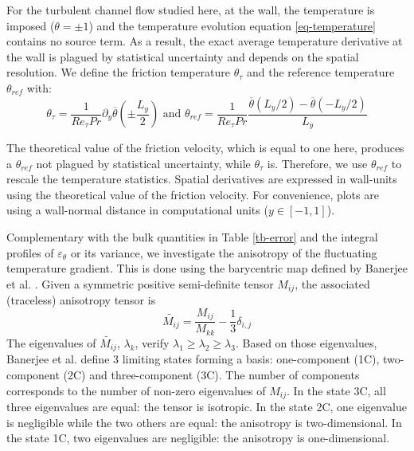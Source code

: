 \documentclass[review]{elsarticle}
\newcommand{\epst}{\varepsilon_\theta}
\begin{document}
For the turbulent channel flow studied here, at the wall, the temperature is imposed ($\theta = \pm 1$) and the temperature evolution equation \ref{eq-temperature} contains no source term. As a result, the exact average temperature derivative at the wall is plagued by statistical uncertainty and depends on the spatial resolution. We define the friction temperature $\theta_\tau$ and the reference temperature $\theta_{ref}$ with:
\begin{equation}
\theta_\tau = \frac{1}{Re_\tau Pr} \partial_y \overline{\theta} \left(\pm \frac{L_y}{2} \right)
\mbox{ and }
\theta_{ref} = \frac{1}{Re_\tau Pr} \frac{\overline{\theta}\left(L_y/2\right)-\overline{\theta}\left(-L_y/2\right)}{L_y}
\end{equation}

The theoretical value of the friction velocity, which is equal to one here, produces a $\theta_{ref}$ not plagued by statistical uncertainty, while $\theta_\tau$ is. Therefore, we use $\theta_{ref}$ to rescale the temperature statistics. Spatial derivatives are expressed in wall-units using the theoretical value of the friction velocity. For convenience, plots are using a wall-normal distance in {\color{red}computational} units ($y \in \left[ -1,1 \right]$).

Complementary with the bulk quantities in Table \ref{tb-error} and the integral profiles of $\epst$ or its variance, we investigate the anisotropy of the fluctuating temperature gradient. This is done using the barycentric map defined by Banerjee et al. \cite{banerjee2007presentation}. Given a symmetric positive semi-definite tensor $M_{ij}$, the associated (traceless) anisotropy tensor is
\begin{equation}
\widetilde{M_{ij}} = \frac{M_{ij}}{M_{kk}}-\frac{1}{3} \delta_{i,j}
\end{equation}
The eigenvalues of $\widetilde{M_{ij}}$, $\lambda_k$, verify $\lambda_1 \geq \lambda_2 \geq \lambda_3$. Based on those eigenvalues, Banerjee et al. \cite{banerjee2007presentation} define 3 limiting states forming a basis: one-component (1C), two-component (2C) and three-component (3C). The number of components corresponds to the number of non-zero eigenvalues of $M_{ij}$. In the state 3C, all three eigenvalues are equal: the tensor is isotropic. In the state 2C, one eigenvalue is negligible while the two others are equal: the anisotropy is two-dimensional. In the state 1C, two eigenvalues are negligible: the anisotropy is one-dimensional.
\end{document}
